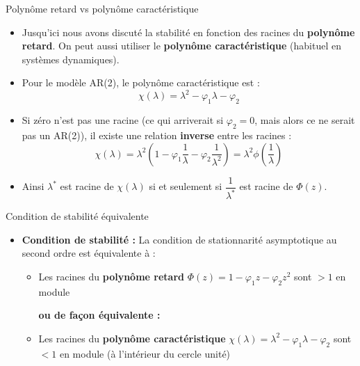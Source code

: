 \documentclass[11pt,aspectratio=169]{beamer}
\begin{document}
\begin{frame}{Polynôme retard vs polynôme caractéristique}

\begin{itemize}

\item Jusqu'ici nous avons discuté la stabilité en fonction des racines du \textbf{polynôme retard}. On peut aussi utiliser le \textbf{polynôme caractéristique} (habituel en systèmes dynamiques).\newline

\item Pour le modèle AR(2), le polynôme caractéristique est :
\[
\chi(\lambda) = \lambda^2 - \varphi_1 \lambda - \varphi_2
\]

\item Si zéro n'est pas une racine (ce qui arriverait si $\varphi_2 = 0$, mais alors ce ne serait pas un AR(2)), il existe une relation \textbf{inverse} entre les racines :
\[
\chi(\lambda) = \lambda^2 \left(1 - \varphi_1 \frac{1}{\lambda} - \varphi_2 \frac{1}{\lambda^2}\right) = \lambda^2 \phi\left(\frac{1}{\lambda}\right)
\]

\item Ainsi $\lambda^*$ est racine de $\chi(\lambda)$ si et seulement si $\dfrac{1}{\lambda^*}$ est racine de $\Phi(z)$.

\end{itemize}
\end{frame}

\begin{frame}{Condition de stabilité équivalente}

\begin{itemize}

\item \textbf{Condition de stabilité :}
La condition de stationnarité asymptotique au second ordre est équivalente à :



\begin{itemize}
\item Les racines du \textbf{polynôme retard} $\Phi(z) = 1 - \varphi_1 z - \varphi_2 z^2$ sont $> 1$ en module



\textbf{ou de façon équivalente :}



\item Les racines du \textbf{polynôme caractéristique} $\chi(\lambda) = \lambda^2 - \varphi_1 \lambda - \varphi_2$ sont $< 1$ en module (à l'intérieur du cercle unité)
\end{itemize}

\end{itemize}
\end{frame}
\end{document}
